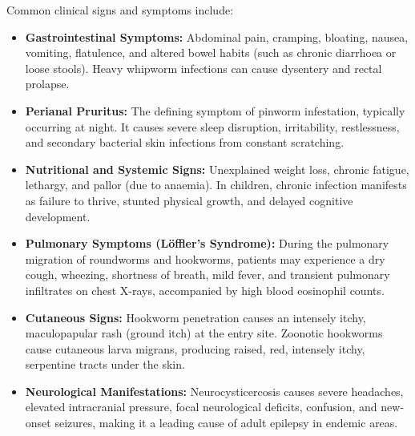 Common clinical signs and symptoms include:
\begin{itemize}
    \item \textbf{Gastrointestinal Symptoms:} Abdominal pain, cramping, bloating, nausea, vomiting, flatulence, and altered bowel habits (such as chronic diarrhoea or loose stools). Heavy whipworm infections can cause dysentery and rectal prolapse.
    \item \textbf{Perianal Pruritus:} The defining symptom of pinworm infestation, typically occurring at night. It causes severe sleep disruption, irritability, restlessness, and secondary bacterial skin infections from constant scratching.
    \item \textbf{Nutritional and Systemic Signs:} Unexplained weight loss, chronic fatigue, lethargy, and pallor (due to anaemia). In children, chronic infection manifests as failure to thrive, stunted physical growth, and delayed cognitive development.
    \item \textbf{Pulmonary Symptoms (L{\"o}ffler's Syndrome):} During the pulmonary migration of roundworms and hookworms, patients may experience a dry cough, wheezing, shortness of breath, mild fever, and transient pulmonary infiltrates on chest X-rays, accompanied by high blood eosinophil counts.
    \item \textbf{Cutaneous Signs:} Hookworm penetration causes an intensely itchy, maculopapular rash (ground itch) at the entry site. Zoonotic hookworms cause cutaneous larva migrans, producing raised, red, intensely itchy, serpentine tracts under the skin.
    \item \textbf{Neurological Manifestations:} Neurocysticercosis causes severe headaches, elevated intracranial pressure, focal neurological deficits, confusion, and new-onset seizures, making it a leading cause of adult epilepsy in endemic areas.
\end{itemize}

